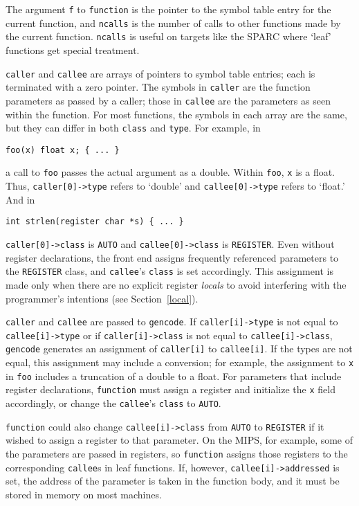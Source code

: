 The argument \verb|f| to \verb|function| is the pointer
to the symbol table entry for the current function,
and \verb|ncalls| is the number of calls to other functions
made by the current function. \verb|ncalls| is useful
on targets like the SPARC where `leaf' functions get special treatment.

\verb|caller| and \verb|callee| are arrays of pointers to symbol
table entries; each is terminated with a zero pointer.
The symbols in \verb|caller| are the function parameters
as passed by a caller; those in \verb|callee| are the parameters
as seen within the function. For most functions,
the symbols in each array are the same, but they
can differ in both \verb|class| and \verb|type|.
For example, in
\begin{verbatim}
foo(x) float x; { ... }
\end{verbatim}
a call to \verb|foo| passes the actual argument as a double.
Within \verb|foo|, \verb|x| is a float.
Thus, \verb|caller[0]->type| refers to `double' and \verb|callee[0]->type|
refers to `float.' And in
\begin{verbatim}
int strlen(register char *s) { ... }
\end{verbatim}
\verb|caller[0]->class| is \verb|AUTO| and \verb|callee[0]->class| is \verb|REGISTER|.
Even without register declarations, the front end assigns
frequently referenced parameters to the \verb|REGISTER| class,
and \verb|callee|'s \verb|class| is set accordingly.
This assignment is made only when there are no explicit register {\em locals}
to avoid interfering with the programmer's intentions (see Section~\ref{local}).

\verb|caller| and \verb|callee| are passed to \verb|gencode|.
If \verb|caller[i]->type| is not equal to \verb|callee[i]->type|
or if \verb|caller[i]->class| is not equal to \verb|callee[i]->class|,
\verb|gencode| generates an assignment of \verb|caller[i]|
to \verb|callee[i]|. If the types are not equal, this assignment
may include a conversion; for example, the assignment to \verb|x| in
\verb|foo| includes a truncation of a double to a float.
For parameters that include register declarations, \verb|function|
must assign a register and initialize the \verb|x| field accordingly,
or change the \verb|callee|'s \verb|class| to \verb|AUTO|.

\verb|function| could also change \verb|callee[i]->class| from \verb|AUTO|
to \verb|REGISTER| if it wished to assign a register to that parameter.
On the MIPS, for example, some of the parameters are passed in registers,
so \verb|function| assigns those registers to the corresponding
\verb|callee|s in leaf functions. If, however, \verb|callee[i]->addressed| is set,
the address of the parameter is taken in the function body,
and it must be stored in memory on most machines.

